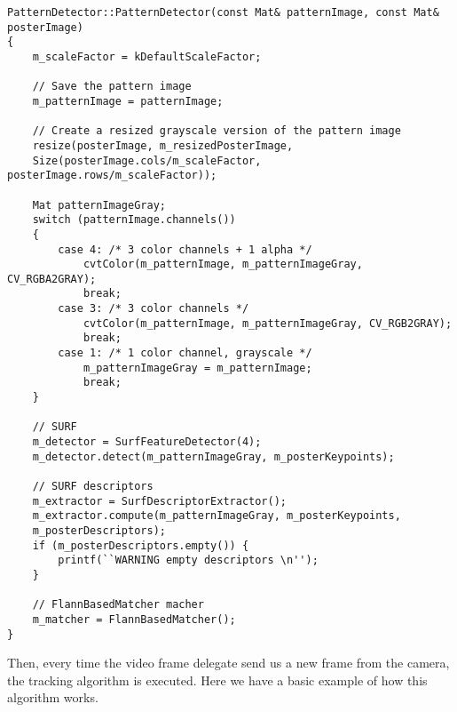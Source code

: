 \begin{verbatim}
PatternDetector::PatternDetector(const Mat& patternImage, const Mat&
posterImage)
{
    m_scaleFactor = kDefaultScaleFactor;
    
    // Save the pattern image
    m_patternImage = patternImage;
    
    // Create a resized grayscale version of the pattern image
    resize(posterImage, m_resizedPosterImage,
    Size(posterImage.cols/m_scaleFactor, posterImage.rows/m_scaleFactor));
    
    Mat patternImageGray;
    switch (patternImage.channels())
    {
        case 4: /* 3 color channels + 1 alpha */
            cvtColor(m_patternImage, m_patternImageGray, CV_RGBA2GRAY);
            break;
        case 3: /* 3 color channels */
            cvtColor(m_patternImage, m_patternImageGray, CV_RGB2GRAY);
            break;
        case 1: /* 1 color channel, grayscale */
            m_patternImageGray = m_patternImage;
            break;
    }
        
    // SURF
    m_detector = SurfFeatureDetector(4);
    m_detector.detect(m_patternImageGray, m_posterKeypoints);
        
    // SURF descriptors
    m_extractor = SurfDescriptorExtractor();
    m_extractor.compute(m_patternImageGray, m_posterKeypoints, 
    m_posterDescriptors);    
    if (m_posterDescriptors.empty()) {
        printf(``WARNING empty descriptors \n'');
    }
    
    // FlannBasedMatcher macher    
    m_matcher = FlannBasedMatcher();
}
\end{verbatim}

Then, every time the video frame delegate send us a new frame from the camera,
the tracking algorithm is executed. Here we have a basic example of how this
algorithm works.

